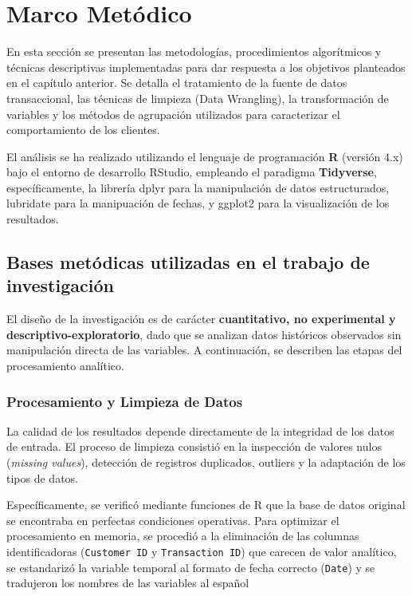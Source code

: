 \documentclass[oneside,11pt]{Latex/Classes/PhDthesisPSnPDF}
\begin{document}
\chapter{Marco Metódico}

En esta sección se presentan las metodologías, procedimientos
algorítmicos y técnicas descriptivas implementadas para dar respuesta a
los objetivos planteados en el capítulo anterior. Se detalla el
tratamiento de la fuente de datos transaccional, las técnicas de
limpieza (Data Wrangling), la transformación de variables y los métodos
de agrupación utilizados para caracterizar el comportamiento de los
clientes.

El análisis se ha realizado utilizando el lenguaje de programación
\textbf{R} (versión 4.x) bajo el entorno de desarrollo RStudio,
empleando el paradigma \textbf{Tidyverse}, específicamente, la librería
dplyr para la manipulación de datos estructurados, lubridate para la
manipuación de fechas, y ggplot2 para la visualización de los
resultados.

\section{Bases metódicas utilizadas en el trabajo de investigación}

El diseño de la investigación es de carácter
\textbf{cuantitativo, no experimental y descriptivo-exploratorio}, dado
que se analizan datos históricos observados sin manipulación directa de
las variables. A continuación, se describen las etapas del procesamiento
analítico.

\subsection{Procesamiento y Limpieza de Datos}

La calidad de los resultados depende directamente de la integridad de
los datos de entrada. El proceso de limpieza consistió en la inspección
de valores nulos (\textit{missing values}), detección de registros
duplicados, outliers y la adaptación de los tipos de datos.

Específicamente, se verificó mediante funciones de R que la base de
datos original se encontraba en perfectas condiciones operativas. Para
optimizar el procesamiento en memoria, se procedió a la eliminación de
las columnas identificadoras (\texttt{Customer ID} y
\texttt{Transaction ID}) que carecen de valor analítico, se estandarizó
la variable temporal al formato de fecha correcto (\texttt{Date}) y se
tradujeron los nombres de las variables al español
\end{document}
